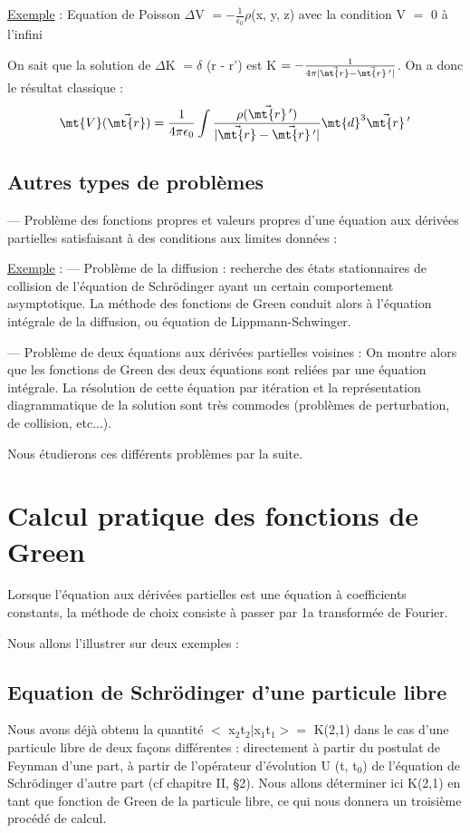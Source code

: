 \ul{Exemple} : Equation de Poisson $\Delta$V $=-\frac{1}{\epsilon_0}\rho$(x, y, z)
avec la condition V $=$ 0 à l'infini

On sait que la solution de $\Delta$K $=\delta$ (r - r') est K $=-\frac{1}{4\pi|\vec{\mt{r}}-\vec{\mt{r}}\,'|}$.
On a donc le résultat classique :
\[
\mt{V}(\vec{\mt{r}})=\frac{1}{4\pi\epsilon_0}
\int\frac{\rho(\vec{\mt{r}}\,')}{|\vec{\mt{r}}-\vec{\mt{r}}\,'|}\mt{d}^3\vec{\mt{r}}\,'
\]

\subsection{Autres types de problèmes}%

— Problème des fonctions propres et valeurs propres d'une
équation aux dérivées partielles satisfaisant à des conditions aux limites
données :

\ul{Exemple} : — Problème de la diffusion : recherche des états stationnaires de
collision de l'équation de Schrödinger ayant un certain comportement
asymptotique. La méthode des fonctions de Green conduit alors à l'équation
intégrale de la diffusion, ou équation de Lippmann-Schwinger.

— Problème de deux équations aux dérivées partielles voisines :
On montre alors que les fonctions de Green des deux équations sont reliées
par une équation intégrale. La résolution de cette équation par itération
et la représentation diagrammatique de la solution sont très commodes
(problèmes de perturbation, de collision, etc...).

Nous étudierons ces différents problèmes par la suite.

\section{Calcul pratique des fonctions de Green}%

Lorsque l'équation aux dérivées partielles est une équation à
coefficients constants, la méthode de choix consiste à passer par 1a
transformée de Fourier.

Nous allons l'illustrer sur deux exemples :

\subsection{Equation de Schrödinger d'une particule libre}%

Nous avons déjà obtenu la quantité $<$ x$_2$t$_2|$x$_1$t$_1> =$ K(2,1)
dans le cas d'une particule libre de deux façons différentes : directement
à partir du postulat de Feynman d'une part, à partir de l'opérateur d'évolution
U (t, t$_0$) de l'équation de Schrödinger d'autre part (cf chapitre II,
\S 2). Nous allons déterminer ici K(2,1) en tant que fonction
de Green de la particule libre, ce qui nous donnera un troisième procédé
de calcul.

